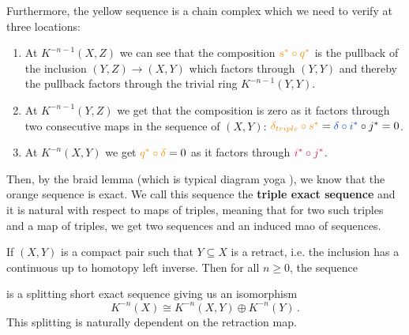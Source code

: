 \begin{corollary}
\begin{center}
\end{center}
Furthermore, the yellow sequence is a chain complex which we need to verify at three locations:
	\begin{enumerate}
		\item At $K^{-n-1}(X,Z)$ we can see that the composition $\textcolor{cT}{s^*\circ q^*}$ is the pullback of the inclusion $(Y,Z)\to (X,Y)$ which factors through $(Y,Y)$ and thereby the pullback factors through the trivial ring $K^{-n-1}(Y,Y)$.
		\item At $K^{-n-1}(Y,Z)$  we get that the composition is zero as it factors through two consecutive maps in the sequence of $(X,Y)$: $\textcolor{cT}{\delta_{triple}\circ s^*}=\textcolor{cXY}{\delta\circ i^*} \circ j^*=0$.
		\item At $K^{-n}(X,Y)$ we get $\textcolor{cT}{q^*\circ \delta}=0$ as it factors through $\textcolor{cYZ}{i^*\circ j^*}$. 
	\end{enumerate}
	Then, by the braid lemma (which is typical diagram yoga  ), we know that the \textcolor{cT}{orange} sequence is exact. We call this sequence the \textbf{triple exact sequence} and it is natural with respect to maps of triples, meaning that for two such triples and a map of triples, we get two sequences and an induced mao of sequences.
\end{corollary}


\begin{corollary}\label{cor:kTheo-retractionsInduceSplittingSequences}
	If $(X,Y)$ is a compact pair such that $Y\subseteq X$ is a retract, i.e. the inclusion has a continuous up to homotopy left inverse. Then for all $n\geq 0$, the sequence 
	\begin{center}
	\end{center} is a splitting short exact sequence giving us an isomorphism
	\begin{equation*}
		K^{-n}(X)\cong K^{-n}(X,Y)\oplus K^{-n}(Y)\,.
	\end{equation*} This splitting is naturally dependent on the retraction map. 
\end{corollary}
